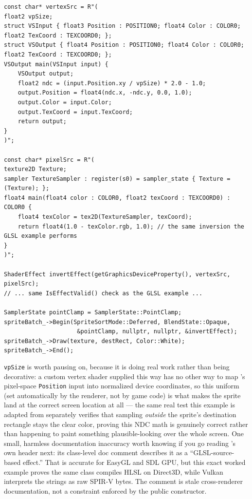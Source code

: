\begin{lstlisting}
const char* vertexSrc = R"(
float2 vpSize;
struct VSInput { float3 Position : POSITION0; float4 Color : COLOR0; float2 TexCoord : TEXCOORD0; };
struct VSOutput { float4 Position : POSITION0; float4 Color : COLOR0; float2 TexCoord : TEXCOORD0; };
VSOutput main(VSInput input) {
    VSOutput output;
    float2 ndc = (input.Position.xy / vpSize) * 2.0 - 1.0;
    output.Position = float4(ndc.x, -ndc.y, 0.0, 1.0);
    output.Color = input.Color;
    output.TexCoord = input.TexCoord;
    return output;
}
)";

const char* pixelSrc = R"(
texture2D Texture;
sampler TextureSampler : register(s0) = sampler_state { Texture = (Texture); };
float4 main(float4 color : COLOR0, float2 texCoord : TEXCOORD0) : COLOR0 {
    float4 texColor = tex2D(TextureSampler, texCoord);
    return float4(1.0 - texColor.rgb, 1.0); // the same inversion the GLSL example performs
}
)";

ShaderEffect invertEffect(getGraphicsDeviceProperty(), vertexSrc, pixelSrc);
// ... same IsEffectValid() check as the GLSL example ...

SamplerState pointClamp = SamplerState::PointClamp;
spriteBatch_->Begin(SpriteSortMode::Deferred, BlendState::Opaque,
                     &pointClamp, nullptr, nullptr, &invertEffect);
spriteBatch_->Draw(texture, destRect, Color::White);
spriteBatch_->End();
\end{lstlisting}

\texttt{vpSize} is worth pausing on, because it is doing real work rather than being decorative:
a custom vertex shader supplied this way has no other way to map 's
pixel-space \texttt{Position} input into normalized device coordinates, so this uniform (set
automatically by the renderer, not by game code) is what makes the sprite land at the correct
screen location at all --- the same real test this example is adapted from separately verifies
that sampling \emph{outside} the sprite's destination rectangle stays the clear color, proving
this NDC math is genuinely correct rather than happening to paint something plausible-looking
over the whole screen. One small, harmless documentation inaccuracy worth knowing if you go
reading 's own header next: its class-level doc comment describes it as
a ``GLSL-source-based effect.'' That is accurate for EasyGL and SDL GPU, but this exact worked
example proves the same class compiles HLSL on Direct3D, while Vulkan interprets the strings as
raw SPIR-V bytes. The comment is stale cross-renderer documentation, not a constraint enforced
by the public constructor.

